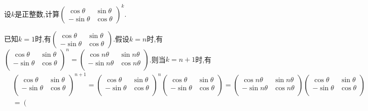 \documentclass[../../main.tex]{subfiles}%
\begin{document}
\begin{example}
设\(k\)是正整数,计算\(\begin{pmatrix}
\cos\theta & \sin\theta\\
-\sin\theta & \cos\theta
\end{pmatrix}^k\).
\end{example}
\begin{solution}
已知$k=1$时,有\(\begin{pmatrix}
\cos\theta & \sin\theta\\
-\sin\theta & \cos\theta
\end{pmatrix}\).假设$k=n$时,有$\left( \begin{matrix}
\cos \theta&		\sin \theta\\
-\sin \theta&		\cos \theta\\
\end{matrix} \right) ^n=\left( \begin{matrix}
\cos n\theta&		\sin n\theta\\
-\sin n\theta&		\cos n\theta\\
\end{matrix} \right) $.则当$k=n+1$时,有
\begin{align*}
&\left( \begin{matrix}
\cos \theta&		\sin \theta\\
-\sin \theta&		\cos \theta\\
\end{matrix} \right) ^{n+1}=\left( \begin{matrix}
\cos \theta&		\sin \theta\\
-\sin \theta&		\cos \theta\\
\end{matrix} \right) ^n\left( \begin{matrix}
\cos \theta&		\sin \theta\\
-\sin \theta&		\cos \theta\\
\end{matrix} \right) =\left( \begin{matrix}
\cos n\theta&		\sin n\theta\\
-\sin n\theta&		\cos n\theta\\
\end{matrix} \right) \left( \begin{matrix}
\cos \theta&		\sin \theta\\
-\sin \theta&		\cos \theta\\
\end{matrix} \right) 
\\
&=\left( \begin{matrix}

\end{matrix}
\end{align*}
\end{solution}
\end{document}
